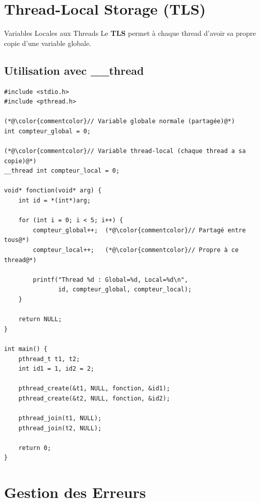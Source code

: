 \documentclass[11pt,a4paper]{article}
\begin{document}
\section{Thread-Local Storage (TLS)}

\begin{definitionbox}{Variables Locales aux Threads}
Le \textbf{TLS} permet à chaque thread d'avoir sa propre copie d'une variable globale.
\end{definitionbox}

\subsection{Utilisation avec \_\_thread}

\begin{lstlisting}[caption={Variables thread-local}]
#include <stdio.h>
#include <pthread.h>

(*@\color{commentcolor}// Variable globale normale (partagée)@*)
int compteur_global = 0;

(*@\color{commentcolor}// Variable thread-local (chaque thread a sa copie)@*)
__thread int compteur_local = 0;

void* fonction(void* arg) {
    int id = *(int*)arg;
    
    for (int i = 0; i < 5; i++) {
        compteur_global++;  (*@\color{commentcolor}// Partagé entre tous@*)
        compteur_local++;   (*@\color{commentcolor}// Propre à ce thread@*)
        
        printf("Thread %d : Global=%d, Local=%d\n",
               id, compteur_global, compteur_local);
    }
    
    return NULL;
}

int main() {
    pthread_t t1, t2;
    int id1 = 1, id2 = 2;
    
    pthread_create(&t1, NULL, fonction, &id1);
    pthread_create(&t2, NULL, fonction, &id2);
    
    pthread_join(t1, NULL);
    pthread_join(t2, NULL);
    
    return 0;
}
\end{lstlisting}

\section{Gestion des Erreurs}
\end{document}
